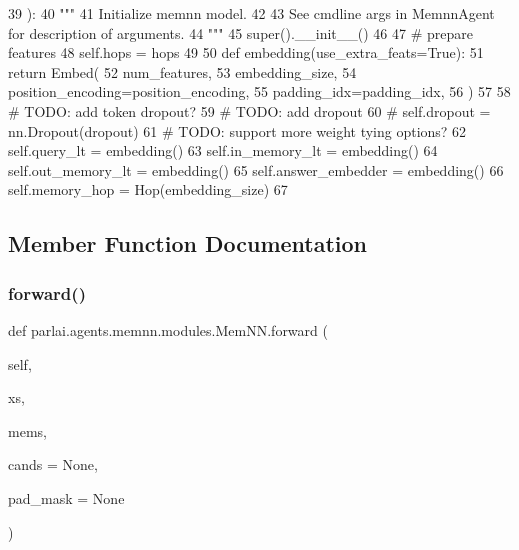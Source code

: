 \begin{DoxyCode}
39     ):
40         \textcolor{stringliteral}{"""}
41 \textcolor{stringliteral}{        Initialize memnn model.}
42 \textcolor{stringliteral}{}
43 \textcolor{stringliteral}{        See cmdline args in MemnnAgent for description of arguments.}
44 \textcolor{stringliteral}{        """}
45         super().\_\_init\_\_()
46 
47         \textcolor{comment}{# prepare features}
48         self.hops = hops
49 
50         \textcolor{keyword}{def }embedding(use\_extra\_feats=True):
51             \textcolor{keywordflow}{return} Embed(
52                 num\_features,
53                 embedding\_size,
54                 position\_encoding=position\_encoding,
55                 padding\_idx=padding\_idx,
56             )
57 
58         \textcolor{comment}{# TODO: add token dropout?}
59         \textcolor{comment}{# TODO: add dropout}
60         \textcolor{comment}{# self.dropout = nn.Dropout(dropout)}
61         \textcolor{comment}{# TODO: support more weight tying options?}
62         self.query\_lt = embedding()
63         self.in\_memory\_lt = embedding()
64         self.out\_memory\_lt = embedding()
65         self.answer\_embedder = embedding()
66         self.memory\_hop = Hop(embedding\_size)
67 
\end{DoxyCode}


\subsection{Member Function Documentation}
\mbox{\label{classparlai_1_1agents_1_1memnn_1_1modules_1_1MemNN_ab4402719d43be5dba7eb6a15074c0273}} 
\subsubsection{\texorpdfstring{forward()}{forward()}}
{\footnotesize\ttfamily def parlai.\+agents.\+memnn.\+modules.\+Mem\+N\+N.\+forward (\begin{DoxyParamCaption}\item[{}]{self,  }\item[{}]{xs,  }\item[{}]{mems,  }\item[{}]{cands = {\ttfamily None},  }\item[{}]{pad\+\_\+mask = {\ttfamily None} }\end{DoxyParamCaption})}

